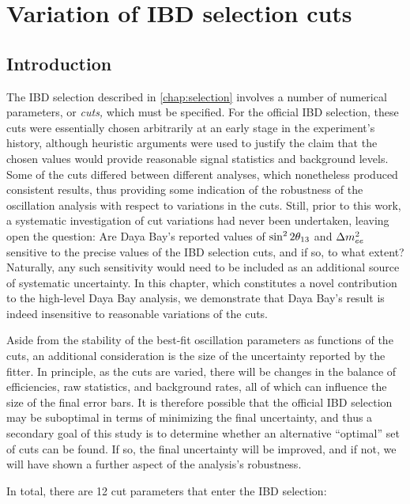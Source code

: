 \documentclass[../thesis.tex]{subfiles}
\begin{document}
\chapter{Variation of IBD selection cuts}
\label{chap:cutVary}

\section{Introduction}
\label{sec:cutVaryIntro}

The IBD selection described in \autoref{chap:selection} involves a number of numerical parameters, or \emph{cuts,} which must be specified. For the official IBD selection, these cuts were essentially chosen arbitrarily at an early stage in the experiment's history, although heuristic arguments were used to justify the claim that the chosen values would provide reasonable signal statistics and background levels. Some of the cuts differed between different analyses, which nonetheless produced consistent results, thus providing some indication of the robustness of the oscillation analysis with respect to variations in the cuts. Still, prior to this work, a systematic investigation of cut variations had never been undertaken, leaving open the question: Are Daya Bay's reported values of $\sin^2 2\theta_{13}$ and $\Delta m^2_{ee}$ sensitive to the precise values of the IBD selection cuts, and if so, to what extent? Naturally, any such sensitivity would need to be included as an additional source of systematic uncertainty. In this chapter, which constitutes a novel contribution to the high-level Daya Bay analysis, we demonstrate that Daya Bay's result is indeed insensitive to reasonable variations of the cuts.

Aside from the stability of the best-fit oscillation parameters as functions of the cuts, an additional consideration is the size of the uncertainty reported by the fitter. In principle, as the cuts are varied, there will be changes in the balance of efficiencies, raw statistics, and background rates, all of which can influence the size of the final error bars. It is therefore possible that the official IBD selection may be suboptimal in terms of minimizing the final uncertainty, and thus a secondary goal of this study is to determine whether an alternative ``optimal'' set of cuts can be found. If so, the final uncertainty will be improved, and if not, we will have shown a further aspect of the analysis's robustness.

In total, there are 12 cut parameters that enter the IBD selection:
\end{document}
